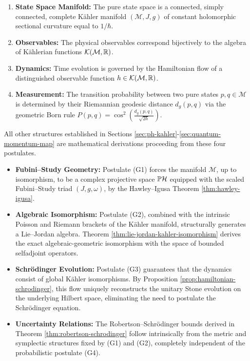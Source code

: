 \begin{enumerate}[label=(\textbf{G\arabic*})]
	\item \textbf{State Space Manifold:} The pure state space is a connected, simply connected, complete Kähler manifold $(\mathcal{M}, J, g)$ of constant holomorphic sectional curvature equal to $1/\hbar$.
	\item \textbf{Observables:} The physical observables correspond bijectively to the algebra of Kählerian functions $\mathcal{K}(\mathcal{M}, \R)$.
	\item \textbf{Dynamics:} Time evolution is governed by the Hamiltonian flow of a distinguished observable function $h \in \mathcal{K}(\mathcal{M}, \R)$.
	\item \textbf{Measurement:} The transition probability between two pure states $p, q \in \mathcal{M}$ is determined by their Riemannian geodesic distance $d_g(p, q)$ via the geometric Born rule $P(p, q) = \cos^2\left(\frac{d_g(p, q)}{\sqrt{2\hbar}}\right)$.
\end{enumerate}

\noindent All other structures established in Sections \ref{sec:ph-kahler}-\ref{sec:quantum-momentum-map} are mathematical derivations proceeding from these four postulates.

\begin{itemize}
	\item \textbf{Fubini--Study Geometry:} Postulate (G1) forces the manifold $\mathcal{M}$, up to isomorphism, to be a complex projective space $\PH$ equipped with the scaled Fubini--Study triad $(J, g, \omega)$, by the Hawley--Igusa Theorem \ref{thm:hawley-igusa}. 
	\item \textbf{Algebraic Isomorphism:} Postulate (G2), combined with the intrinsic Poisson and Riemann brackets of the Kähler manifold, structurally generates a Lie--Jordan algebra. Theorem \ref{thm:lie-jordan-kahler-isomorphism} derives the exact algebraic-geometric isomorphism with the space of bounded selfadjoint operators. 
	\item \textbf{Schrödinger Evolution:} Postulate (G3) guarantees that the dynamics consist of global Kähler isomorphisms. By Proposition \ref{prop:hamiltonian-schrodinger}, this flow uniquely reconstructs the unitary Stone evolution on the underlying Hilbert space, eliminating the need to postulate the Schrödinger equation. 
	\item \textbf{Uncertainty Relations:} The Robertson--Schrödinger bounds derived in Theorem \ref{thm:robertson-schrodinger} follow intrinsically from the metric and symplectic structures fixed by (G1) and (G2), completely independent of the probabilistic postulate (G4). 
\end{itemize}

